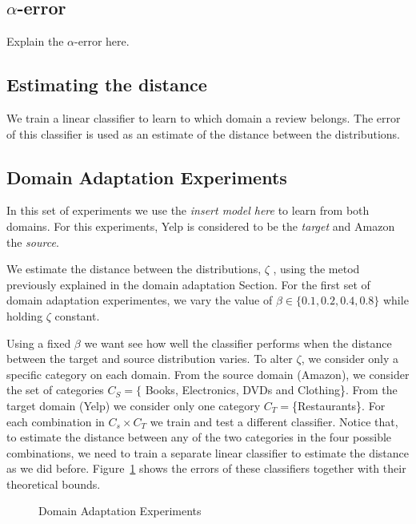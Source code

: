 \documentclass[letterpaper]{article}
\begin{document}
\subsection{$\alpha$-error}
\label{sec:alpha-error}

Explain the $\alpha$-error here.

\subsection{Estimating the distance}
\label{sec:estimating-distance}

We train a linear classifier to learn to which domain a review
belongs. The error of this classifier is used as an estimate of the
distance between the distributions.


\subsection{Domain Adaptation Experiments}
\label{sec:domain-adaptation}

In this set of experiments we use the \emph{insert model here} to
learn from both domains. For this experiments, Yelp is considered to be
the \emph{target} and Amazon the \emph{source}.

We estimate the distance between the distributions, $\zeta$ , using the metod
previously explained in the domain adaptation Section. For the first
set of domain adaptation experimentes, we vary the value of $\beta \in
\{0.1, 0.2, 0.4, 0.8\}$ while holding $\zeta$ constant.

Using a fixed $\beta$ we want see how well the classifier performs
when the distance between the target and source distribution
varies. To alter $\zeta$, we consider only a specific category on each
domain. From the source domain (Amazon), we consider the set of
categories $C_S=\{$ Books, Electronics, DVDs and Clothing\}. From the
target domain (Yelp) we consider only one category
$C_T=$\{Restaurants\}. For each combination in $C_s\times C_T$ we train
and test a different classifier. Notice that, to estimate the distance
between any of the two categories in the four possible combinations,
we need to train a separate linear classifier to estimate the distance
as we did before. Figure~\ref{fig:domain-adaptation} shows the errors
of these classifiers together with their theoretical bounds.

\begin{figure}
  \centering
  
  \caption{Domain Adaptation Experiments}
  \label{fig:domain-adaptation}
\end{figure}
\end{document}
